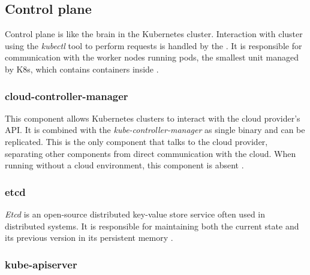 


\subsection{Control plane}
\label{sec:k8s_cplane}

Control plane is like the brain in the Kubernetes cluster. Interaction with cluster using the \textit{kubectl} tool to perform requests is handled by the \textit{}. It is responsible for communication with the worker nodes running pods, the smallest unit managed by K8s, which contains containers inside \cite{KubernetesDocs}.


\subsubsection{cloud-controller-manager}
\label{sec:cloudControllerManager}

This component allows Kubernetes clusters to interact with the cloud provider's API. It is combined with the \textit{kube-controller-manager} as single binary and can be replicated. This is the only component that talks to the cloud provider, separating other components from direct communication with the cloud. When running without a cloud environment, this component is absent \cite{KubernetesDocs}.


\subsubsection{etcd}
\label{sec:etcd}

\textit{Etcd} is an open-source distributed key-value store service often used in distributed systems. It is responsible for maintaining both the current state and its previous version in its persistent memory \cite{KubernetesDocs}\cite{Etcd}.


\subsubsection{kube-apiserver}
\label{sec:kubeApiServer}

